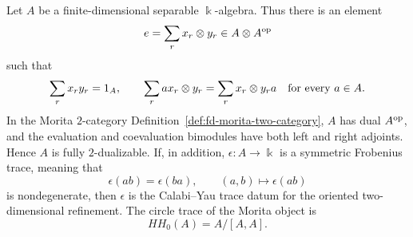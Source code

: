 \begin{theorem}
\label{thm:separable-algebra-two-dualizable}
Let \(A\) be a finite-dimensional separable \(\Bbbk\)-algebra.  Thus there is
an element
\[
  e=\sum_r x_r\otimes y_r\in A\otimes A^{\rm op}
\]
such that
\begin{equation}
  \sum_r x_ry_r=1_A,
  \qquad
  \sum_r ax_r\otimes y_r=\sum_r x_r\otimes y_ra
  \quad\hbox{for every }a\in A .
  \label{eq:separability-idempotent-identities}
\end{equation}
In the Morita \(2\)-category
Definition~\ref{def:fd-morita-two-category}, \(A\) has dual \(A^{\rm op}\),
and the evaluation and coevaluation bimodules have both left and right
adjoints.  Hence \(A\) is fully \(2\)-dualizable.  If, in addition,
\(\epsilon:A\to\Bbbk\) is a symmetric Frobenius trace, meaning that
\[
  \epsilon(ab)=\epsilon(ba),
  \qquad
  (a,b)\mapsto \epsilon(ab)
\]
is nondegenerate, then \(\epsilon\) is the Calabi--Yau trace datum for the
oriented two-dimensional refinement.  The circle trace of the Morita object is
\[
  HH_0(A)=A/[A,A].
\]
\end{theorem}

